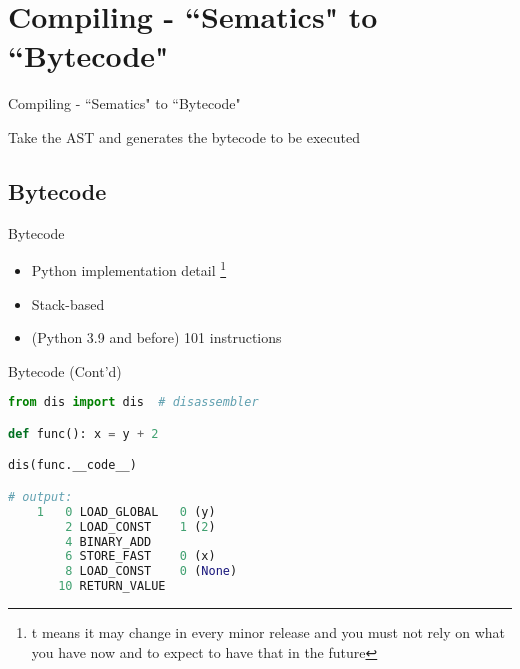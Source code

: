 \section{Compiling - ``Sematics" to ``Bytecode"}
\begin{frame}{Compiling - ``Sematics" to ``Bytecode"}
\begin{itemize}
    {\LARGE \item[-] Take the AST and generates the bytecode to be executed}
\end{itemize}
\end{frame}

\subsection{Bytecode}
\begin{frame}{Bytecode}
\begin{itemize}
\item[-] Python implementation detail  \footnote{t means it may change in every minor release and you must not rely on what you have now
    and to expect to have that in the future}

\item[-] Stack-based
\item[-] (Python 3.9 and before) 101 instructions
\end{itemize}
\end{frame}

\begin{frame}[fragile]{Bytecode (Cont'd)}
\begin{flushleft}
\begin{lstlisting}[language=python, keywordstyle=\color{Mulberry}\textbf]
from dis import dis  # disassembler

def func(): x = y + 2

dis(func.__code__)

# output:
    1   0 LOAD_GLOBAL   0 (y)
        2 LOAD_CONST    1 (2)
        4 BINARY_ADD
        6 STORE_FAST    0 (x)
        8 LOAD_CONST    0 (None)
       10 RETURN_VALUE
\end{lstlisting}
\end{flushleft}
\end{frame}
